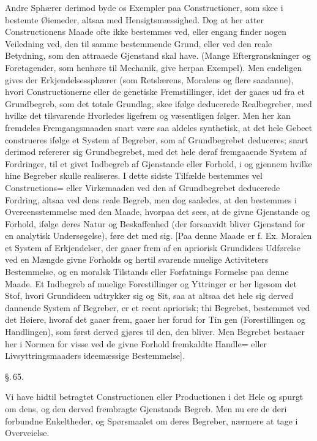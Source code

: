 \documentclass[12pt]{book}
\def\textit#1{#1}%
\newcommand{\parag}[1]{%
  \par\vspace{0.9\baselineskip}%
  {\centering\textit{\S.\,#1.}\par}%
  \vspace{0.35\baselineskip}%
  \noindent\hspace{\parindent}\ignorespaces
}
\newcommand{\opage}[1]{\marginnote{\footnotesize\textit{[#1]}}}
\begin{document}
Andre Sphærer derimod byde os Exempler paa Constructioner, som skee i bestemte
Øiemeder, altsaa med Hensigtsmæssighed. Dog at her atter Constructionens Maade
ofte ikke bestemmes ved, eller engang finder nogen Veiledning ved, den til
samme bestemmende Grund, eller ved den reale Betydning, som den attraaede
Gjenstand skal have. (Mange Eftergranskninger og Foretagender, som henhøre til
Mechanik, give herpaa Exempel). Men endeligen gives der Erkjendelsessphærer
(som Retslærens, Moralens og flere saadanne), hvori Constructionerne eller de
genetiske Fremstillinger, idet der gaaes ud fra et Grundbegreb, som det totale
Grundlag, skee
\opage{171} ifølge deducerede Realbegreber, med hvilke det tilsvarende Hvorledes ligefrem
og væsentligen følger. Men her kan fremdeles Fremgangsmaaden snart være saa
aldeles synthetisk, at det hele Gebeet construeres ifølge et System af
Begreber, som af Grundbegrebet deduceres; snart derimod refererer sig
Grundbegrebet, med det hele deraf fremgaaende System af Fordringer, til et
givet Indbegreb af Gjenstande eller Forhold, i og gjennem hvilke hine Begreber
skulle realiseres. I dette sidste Tilfælde bestemmes vel Constructions= eller
Virkemaaden ved den af Grundbegrebet deducerede Fordring, altsaa ved dens reale
Begreb, men dog saaledes, at den bestemmes i Overeensstemmelse med den Maade,
hvorpaa det sees, at de givne Gjenstande og Forhold, ifølge deres Natur og
Beskaffenhed (der forsaavidt bliver Gjenstand for en analytisk Undersøgelse),
føre det med sig. [Paa denne Maade er f. Ex. Moralen et System af Erkjendelser,
der gaaer frem af en apriorisk Grundidees Udførelse ved en Mængde givne
Forholds og hertil svarende muelige Activiteters Bestemmelse, og en moralsk
Tilstands eller Forfatnings Formelse paa denne Maade. Et Indbegreb af muelige
Forestillinger og Yttringer er her ligesom det Stof, hvori Grundideen udtrykker
sig og Sit, saa at altsaa det hele sig derved dannende System af Begreber, er
et reent apriorisk; thi Begrebet, bestemmet ved det Høiere, hvoraf det gaaer
frem, gaaer her forud for Tin%
\opage{172}gen (Forestillingen og Handlingen), som først derved gjøres til den, den
bliver. Men Begrebet bestaaer her i Normen for visse ved de givne Forhold
fremkaldte Handle= eller Livsyttringsmaaders ideemæssige Bestemmelse].

\parag{65}

Vi have hidtil betragtet Constructionen eller Productionen i det Hele og spurgt
om dens, og den derved frembragte Gjenstands Begreb. Men nu ere de deri
forbundne Enkeltheder, og Spørsmaalet om deres Begreber, nærmere at tage i
Overveielse.
\end{document}
